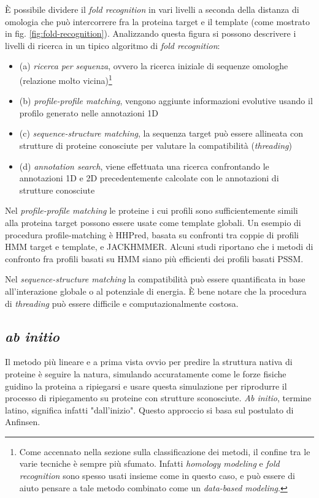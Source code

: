 {È possibile dividere il \textit{fold recognition} in vari livelli a seconda della distanza di omologia che può intercorrere fra la proteina target e il template (come mostrato in fig. \ref{fig:fold-recognition}). Analizzando questa figura si possono descrivere i livelli di ricerca in un tipico algoritmo di \textit{fold recognition}:

\begin{itemize}
	\item (a) \textit{ricerca per sequenza}, ovvero la ricerca iniziale di sequenze omologhe (relazione molto vicina)\footnote{Come accennato nella sezione sulla classificazione dei metodi, il confine tra le varie tecniche è sempre più sfumato. Infatti \textit{homology modeling }e \textit{fold recognition} sono spesso usati insieme come in questo caso, e può essere di aiuto pensare a tale metodo combinato come un \textit{data-based modeling}.}
	\item (b) \textit{profile-profile matching}, vengono aggiunte informazioni evolutive usando il profilo generato nelle annotazioni 1D
	\item (c) \textit{sequence-structure matching}, la sequenza target può essere allineata con strutture di proteine conosciute per valutare la compatibilità (\textit{threading})
	\item (d) \textit{annotation search}, viene effettuata una ricerca confrontando le annotazioni 1D e 2D precedentemente calcolate con le annotazioni di strutture conosciute
\end{itemize}

Nel \textit{profile-profile matching} le proteine i cui profili sono sufficientemente simili alla proteina target possono essere usate come template globali. Un esempio di procedura profile-matching è HHPred, basata su confronti tra coppie di profili HMM target e template, e JACKHMMER. Alcuni studi riportano che i metodi di confronto fra profili basati su HMM siano più efficienti dei profili basati PSSM\supercite{joseph2014local}.

\par Nel \textit{sequence-structure matching} la compatibilità può essere quantificata in base all'interazione globale o al potenziale di energia. È bene notare che la procedura di \textit{threading} può essere difficile e computazionalmente costosa.


\subsection{\textit{ab initio}} \label{sec:ab-initio}
{
Il metodo più lineare e a prima vista ovvio per predire la struttura nativa di proteine è seguire la natura, simulando accuratamente come le forze fisiche guidino la proteina a ripiegarsi e usare questa simulazione per riprodurre il processo di ripiegamento su proteine con strutture sconosciute. \textit{Ab initio}, termine latino, significa infatti "dall'inizio". Questo approccio si basa sul postulato di Anfinsen.

}}
